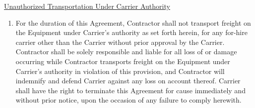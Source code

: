 \underline{Unauthorized Transportation Under Carrier Authority}
\begin{enumerate}[
    ref = \SecondLevelEnumerator
]
    \item For the duration of this Agreement, Contractor shall not
    transport freight on the Equipment under Carrier's authority as set
    forth herein, for any for-hire carrier other than the Carrier without
    prior approval by the Carrier. Contractor shall be solely responsible
    and liable for all loss of or damage occurring while Contractor
    transports freight on the Equipment under Carrier's authority in
    violation of this provision, and Contractor will indemnify and defend
    Carrier against any loss on account thereof. Carrier shall have the
    right to terminate this Agreement for cause immediately and without
    prior notice, upon the occasion of any failure to comply herewith.
\end{enumerate}